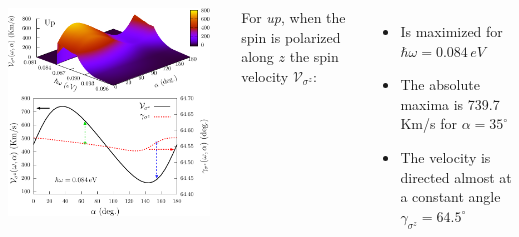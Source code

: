 \documentclass{beamer}
\begin{document}
\begin{frame}

\begin{columns}


\begin{center}

\includegraphics[width=0.95\textwidth]{figs/fig4.pdf}

\end{center}  



{ For \emph{up}, when the spin is polarized along $z$ the spin velocity
$\mathcal{V}_{\sigma^{z}}$:}


\vspace{-2mm}

{\small

\begin{itemize}

\item 
Is maximized for $\hbar \omega = 0.084\,eV$

\vspace{-1mm}
\item 
The absolute maxima is 739.7\,Km/s for $\alpha = 35^{\circ}$

\vspace{-1mm}
\item 
The velocity is directed almost at a constant angle $\gamma_{\sigma^{z}} =
64.5^
{\circ}$


\end{itemize}}
\end{columns}
\end{frame}
\end{document}
